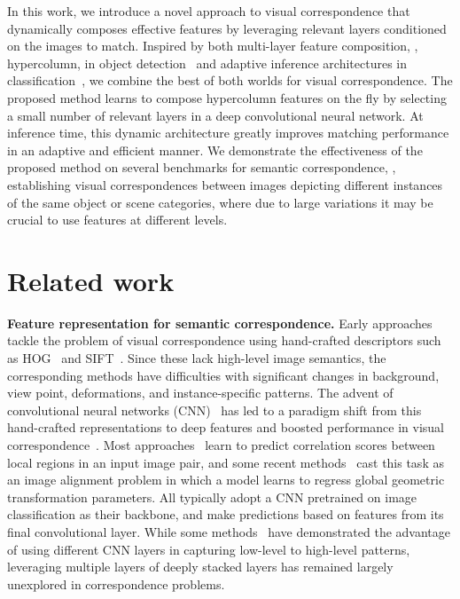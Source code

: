 \documentclass[runningheads]{llncs}
\begin{document}
In this work, we introduce a novel approach to visual correspondence that dynamically composes effective features by leveraging relevant layers conditioned on the images to match.  
Inspired by both multi-layer feature composition, \ie, hypercolumn, in object detection~\cite{hariharan2015hypercolumns,kong2016hypernet,lin2017feature,liu2018receptive} and adaptive inference architectures in classification~\cite{figurnov2017spatially,srivastava2015highway,veit2018convolutional}, we combine the best of both worlds for visual correspondence.
The proposed method learns to compose hypercolumn features on the fly by selecting a small number of relevant layers in a deep convolutional neural network.   
At inference time, this dynamic architecture greatly improves matching performance in an adaptive and efficient manner.
We demonstrate the effectiveness of the proposed method on several benchmarks for semantic correspondence, \ie, establishing visual correspondences between images depicting different instances of the same object or scene categories, where due to large variations it may be crucial to use features at different levels.
 

\section{Related work}

\noindent \textbf{Feature representation for semantic correspondence.}
Early approaches~\cite{bristow2015dense,cho2015unsupervised,ham2016proposal,kim2013deformable,liu2011sift,taniai2016joint,yang2017object} tackle the problem of visual correspondence using hand-crafted descriptors such as HOG~\cite{dalal2005histograms} and SIFT~\cite{lowe2004sift}. 
Since these lack high-level image semantics, the corresponding methods have difficulties with significant changes in background, view point, deformations, and instance-specific patterns.
The advent of convolutional neural networks (CNN)~\cite{he2016deep,krizhevsky2012imagenet} has led to a paradigm shift from this hand-crafted representations to deep features and boosted performance in visual correspondence~\cite{fathy2018hierarchical,novotny2017anchornet,zhou2016learning}. 
Most approaches~\cite{choy2016universal,han2017scnet,kim2017fcss,rocco2018neighbourhood} learn to predict correlation scores between local regions in an input image pair, and some recent methods~\cite{jeon2018parn,kanazawa2016warpnet,kim2018recurrent,rocco17geocnn,rocco18weak,paul2018attentive} cast this task as an image alignment problem in which a model learns to regress global geometric transformation parameters.
All typically adopt a CNN pretrained on image classification as their backbone, and make predictions based on features from its final convolutional layer. 
While some methods~\cite{long2014convnets,zeiler2014visual} have demonstrated the advantage of using different CNN layers in capturing low-level to high-level patterns, leveraging multiple layers of deeply stacked layers has remained largely unexplored in correspondence problems.
\end{document}

